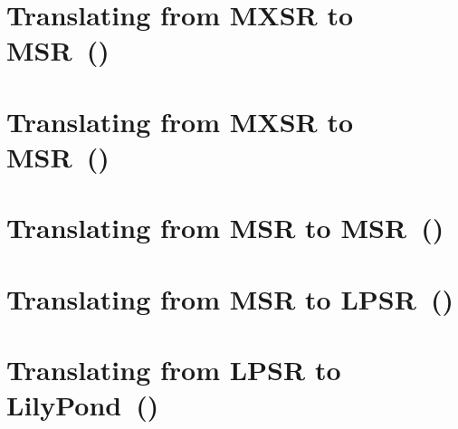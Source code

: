 \section{Translating from MXSR to MSR\ (\mxsrToMsr{})}


\section{Translating from MXSR to MSR\ (\mxsrToMsr{})}


\section{Translating from MSR to MSR\ (\msrToMsr{})}


\section{Translating from MSR to LPSR\ (\msrToLpsr{})}


\section{Translating from LPSR to LilyPond\ (\lpsrToLilypond{})}


